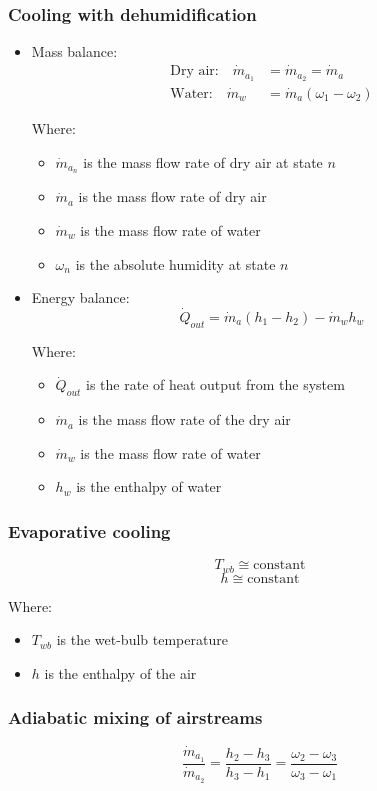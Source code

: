 \documentclass[11pt]{article}
\begin{document}
\subsubsection{Cooling with dehumidification}
\label{sec:orge848b1f}
\begin{itemize}
\item Mass balance:
\begin{align*}
\text{Dry air:} \quad \dot{m}_{a_1} &= \dot{m}_{a_2} = \dot{m}_a \\
\text{Water:} \quad \dot{m}_w &= \dot{m}_a (\omega_1 - \omega_2)
\end{align*}

Where:
\begin{itemize}
\item \(\dot{m}_{a_n}\) is the mass flow rate of dry air at state \(n\)
\item \(\dot{m}_{a}\) is the mass flow rate of dry air
\item \(\dot{m}_w\) is the mass flow rate of water
\item \(\omega_n\) is the absolute humidity at state \(n\)
\end{itemize}

\item Energy balance:
\[\dot{Q}_{out} = \dot{m}_a (h_1 - h_2) - \dot{m}_w h_w\]

Where:
\begin{itemize}
\item \(\dot{Q}_{out}\) is the rate of heat output from the system
\item \(\dot{m}_a\) is the mass flow rate of the dry air
\item \(\dot{m}_w\) is the mass flow rate of water
\item \(h_w\) is the enthalpy of water
\end{itemize}
\end{itemize}
\subsubsection{Evaporative cooling}
\label{sec:org9231c96}
\[T_{wb} \cong \text{constant}\]
\[h \cong \text{constant}\]

Where:
\begin{itemize}
\item \(T_{wb}\) is the wet-bulb temperature
\item \(h\) is the enthalpy of the air
\end{itemize}
\subsubsection{Adiabatic mixing of airstreams}
\label{sec:org1b234f3}
\[\frac{\dot{m}_{a_1}}{\dot{m}_{a_2}} = \frac{h_2 - h_3}{h_3 - h_1} = \frac{\omega_2 - \omega_3}{\omega_3 - \omega_1}\]
\end{document}
